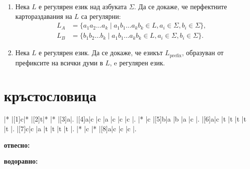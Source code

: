 \documentclass[a4paper]{scrartcl}
\begin{document}
\begin{enumerate}
    \item Нека $L$ е регулярен език над азбуката $\Sigma$. Да се докаже, че перфектните картораздавания на $L$ са регулярни:
        \begin{align*}
            L_A &= \{a_1 a_2 \dots a_k \mid a_1 b_1 \dots a_k b_k \in L, a_i \in \Sigma, b_i \in \Sigma\}, \\
            L_B &= \{b_1 b_2 \dots b_k \mid a_1 b_1 \dots a_k b_k \in L, a_i \in \Sigma, b_i \in \Sigma\}.
        \end{align*}
    \item Нека $L$ е регулярен език. Да се докаже, че езикът $L_{\text{prefix}}$, образуван от префиксите на всички думи в $L$, e регулярен език.
        
\end{enumerate}

\section*{кръстословица}
\begin{Puzzle}{7}{6}
    |*   |[1]c|*   |[2]t|*   |*   |[3]a|.
    |[4]a|c   |c   |a   |c   |c   |c   |.
    |*   |c   |[5]b|a   |b   |a   |c   |.
    |[6]a|c   |t   |t   |t   |t   |t   |.
    |[7]c|c   |a   |t   |t   |t   |t   |.
    |*   |c   |*   |[8]a|c   |c   |c   |.
\end{Puzzle}
\begin{PuzzleClues}{\textbf{отвесно:}}
     \\
\end{PuzzleClues}
\begin{PuzzleClues}{\textbf{водоравно:}}
     \\
\end{PuzzleClues}
\end{document}
